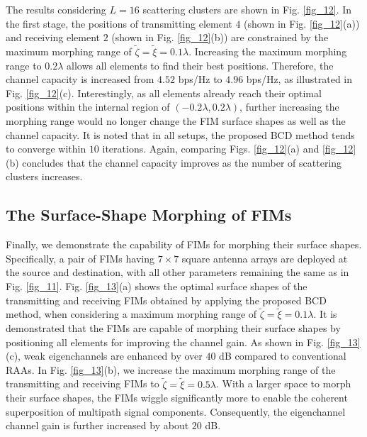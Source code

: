\documentclass[lettersize,journal]{IEEEtran}
\begin{document}
The results considering $L = 16$ scattering clusters are shown in Fig. \ref{fig_12}. In the first stage, the positions of transmitting element $4$ (shown in Fig. \ref{fig_12}(a)) and receiving element $2$ (shown in Fig. \ref{fig_12}(b)) are constrained by the maximum morphing range of $\tilde \zeta = \tilde \xi= 0.1\lambda$. Increasing the maximum morphing range to $0.2\lambda$ allows all elements to find their best positions. Therefore, the channel capacity is increased from $4.52$ bps/Hz to $4.96$ bps/Hz, as illustrated in Fig. \ref{fig_12}(c). Interestingly, as all elements already reach their optimal positions within the internal region of $\left ( -0.2\lambda, 0.2\lambda \right )$, further increasing the morphing range would no longer change the FIM surface shapes as well as the channel capacity. It is noted that in all setups, the proposed BCD method tends to converge within $10$ iterations. Again, comparing Figs. \ref{fig_12}(a) and \ref{fig_12}(b) concludes that the channel capacity improves as the number of scattering clusters increases.



\subsection{The Surface-Shape Morphing of FIMs}\label{sec63}
Finally, we demonstrate the capability of FIMs for morphing their surface shapes. Specifically, a pair of FIMs having $7 \times 7$ square antenna arrays are deployed at the source and destination, with all other parameters remaining the same as in Fig. \ref{fig_11}. Fig. \ref{fig_13}(a) shows the optimal surface shapes of the transmitting and receiving FIMs obtained by applying the proposed BCD method, when considering a maximum morphing range of $\tilde \zeta = \tilde \xi = 0.1\lambda$. It is demonstrated that the FIMs are capable of morphing their surface shapes by positioning all elements for improving the channel gain. As shown in Fig. \ref{fig_13}(c), weak eigenchannels are enhanced by over $40$ dB compared to conventional RAAs. In Fig. \ref {fig_13}(b), we increase the maximum morphing range of the transmitting and receiving FIMs to $\tilde \zeta = \tilde \xi = 0.5\lambda$. With a larger space to morph their surface shapes, the FIMs wiggle significantly more to enable the coherent superposition of multipath signal components. Consequently, the eigenchannel channel gain is further increased by about $20$ dB.
\end{document}
